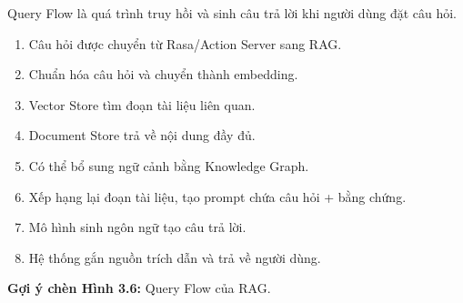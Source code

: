 Query Flow là quá trình truy hồi và sinh câu trả lời khi người dùng đặt câu hỏi.
\begin{enumerate}
    \item Câu hỏi được chuyển từ Rasa/Action Server sang RAG.
    \item Chuẩn hóa câu hỏi và chuyển thành embedding.
    \item Vector Store tìm đoạn tài liệu liên quan.
    \item Document Store trả về nội dung đầy đủ.
    \item Có thể bổ sung ngữ cảnh bằng Knowledge Graph.
    \item Xếp hạng lại đoạn tài liệu, tạo prompt chứa câu hỏi + bằng chứng.
    \item Mô hình sinh ngôn ngữ tạo câu trả lời.
    \item Hệ thống gắn nguồn trích dẫn và trả về người dùng.
\end{enumerate}

\textbf{Gợi ý chèn Hình 3.6:} Query Flow của RAG.
